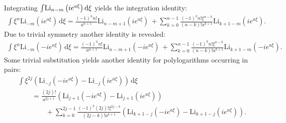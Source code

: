 Integrating $\int \! \operatorname{Li}_{n-m}\left(ie^{a\xi}\right) \mathrm{d}\xi$ yields the integration identity:
\begin{align}
	\int \! \xi^{n}\mathrm{Li}_{-m}(ie^{a\xi}) \, \mathrm{d}\xi
	=  \frac{(-1)^n n!}{a^{n+1}} \mathrm{Li}_{n - m + 1}(ie^{a\xi}) \,
	+ \sum_{k=0}^{n-1} \!
	\frac{(-1)^k n! \xi^{n-k}}{(n-k)! a^{k+1}} \mathrm{Li}_{k+1-m}(ie^{a\xi}).
\end{align}
Due to trivial symmetry another identity is revealed:
\begin{align}
	\int \! \xi^{n}\mathrm{Li}_{-m}(-ie^{a\xi}) \, \mathrm{d}\xi
	=  \frac{(-1)^n n!}{a^{n+1}} \mathrm{Li}_{n - m + 1}(-ie^{a\xi}) \,
	+ \sum_{k=0}^{n-1} \!
	\frac{(-1)^k n! \xi^{n-k}}{(n-k)! a^{k+1}} \mathrm{Li}_{k+1-m}(-ie^{a\xi}).
\end{align}
Some trivial substitution yields another identity for polylogarithms occurring in pairs:
\begin{align}
&\int \! \xi^{2j}\left(\mathrm{Li}_{-j}(-ie^{a\xi}) - \mathrm{Li}_{-j}(ie^{a\xi}) \right) \, \mathrm{d}\xi \\
&\quad\quad = \frac{(2j)!}{a^{2j+1}} \left(
    \mathrm{Li}_{j + 1}(-ie^{a\xi})  - \mathrm{Li}_{j + 1}(ie^{a\xi}) 
\right) \\
&\quad\quad\quad\quad+ \sum_{k=0}^{2j-1} \!
    \frac{(-1)^k (2j)! \xi^{2j-k}}{(2j-k)! a^{k+1}} \left(
        \mathrm{Li}_{k+1-j}(-ie^{a\xi}) - \mathrm{Li}_{k+1-j}(ie^{a\xi})
    \right).
\end{align}

